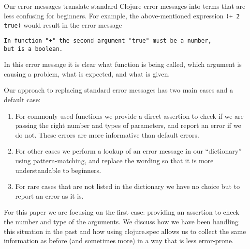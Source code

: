 \documentclass[12pt]{article}
\begin{document}
Our error messages translate standard Clojure error messages into terms that are less confusing for beginners. 
For example, the above-mentioned expression  {\tt (+ 2 true)} would result in the error message
\begin{verbatim}
In function "+" the second argument "true" must be a number, 
but is a boolean. 
\end{verbatim} 
In this error message it is clear what function is being called, which argument is causing a problem, 
what is expected, and what is given. 

Our approach to replacing standard error messages has two main cases and a default case:
\begin{enumerate}
\item For commonly used functions we provide a direct assertion to check if we are passing the right number and types 
of parameters, and report an error if we do not. These errors are more informative than default errors.
\item For other cases we perform a lookup of an error message in our ``dictionary'' using pattern-matching, 
and replace the wording so that it is more understandable to beginners. 
\item For rare cases that are not listed in the dictionary we have no choice but to report an error as it is. 
\end{enumerate}
For this paper we are focusing on the first case: providing an assertion to check the number and type of the
arguments. We discuss how we have been handling this situation in the past and how using clojure.spec 
allows us to collect the same information as before (and sometimes more) in a way that is less error-prone. 
\end{document}
